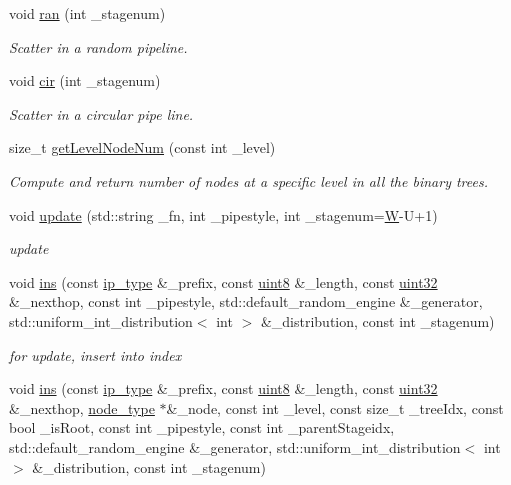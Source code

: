 \begin{DoxyCompactItemize}
void \hyperlink{classRBTree_a8e126bc471ce34a36722f61ff833f002}{ran} (int \-\_\-stagenum)
\begin{DoxyCompactList}\small\item\em Scatter in a random pipeline. \end{DoxyCompactList}\item 
void \hyperlink{classRBTree_aaa068099e5f827f9932e7dca7ac4cd7c}{cir} (int \-\_\-stagenum)
\begin{DoxyCompactList}\small\item\em Scatter in a circular pipe line. \end{DoxyCompactList}\item 
size\-\_\-t \hyperlink{classRBTree_a21eb3efc682903ef05b49472ec3d49c2}{get\-Level\-Node\-Num} (const int \-\_\-level)
\begin{DoxyCompactList}\small\item\em Compute and return number of nodes at a specific level in all the binary trees. \end{DoxyCompactList}\item 
void \hyperlink{classRBTree_ad0ebeb84ec09a401643603abf9342d50}{update} (std\-::string \-\_\-fn, int \-\_\-pipestyle, int \-\_\-stagenum=\hyperlink{test__u128_8cpp_ab21b528bc38899d04d3a7053e52fb797}{W}-\/U+1)
\begin{DoxyCompactList}\small\item\em update \end{DoxyCompactList}\item 
void \hyperlink{classRBTree_a67b0d6c81596d0f3afafc3c1a45800f8}{ins} (const \hyperlink{classRBTree_ab52ca1695103152fd0b1c2b84a33db8b}{ip\-\_\-type} \&\-\_\-prefix, const \hyperlink{types_8h_a34ecedcf03a70dc91e4616212d79267d}{uint8} \&\-\_\-length, const \hyperlink{types_8h_abd01e8e67e3d94cab04ecaaf4f85ac1b}{uint32} \&\-\_\-nexthop, const int \-\_\-pipestyle, std\-::default\-\_\-random\-\_\-engine \&\-\_\-generator, std\-::uniform\-\_\-int\-\_\-distribution$<$ int $>$ \&\-\_\-distribution, const int \-\_\-stagenum)
\begin{DoxyCompactList}\small\item\em for update, insert into index \end{DoxyCompactList}\item 
void \hyperlink{classRBTree_a678b8ede680b0b3d3418eecfe9b665e1}{ins} (const \hyperlink{classRBTree_ab52ca1695103152fd0b1c2b84a33db8b}{ip\-\_\-type} \&\-\_\-prefix, const \hyperlink{types_8h_a34ecedcf03a70dc91e4616212d79267d}{uint8} \&\-\_\-length, const \hyperlink{types_8h_abd01e8e67e3d94cab04ecaaf4f85ac1b}{uint32} \&\-\_\-nexthop, \hyperlink{classRBTree_a34cd65cfffec3d99e0a73deafa471078}{node\-\_\-type} $\ast$\&\-\_\-node, const int \-\_\-level, const size\-\_\-t \-\_\-tree\-Idx, const bool \-\_\-is\-Root, const int \-\_\-pipestyle, const int \-\_\-parent\-Stageidx, std\-::default\-\_\-random\-\_\-engine \&\-\_\-generator, std\-::uniform\-\_\-int\-\_\-distribution$<$ int $>$ \&\-\_\-distribution, const int \-\_\-stagenum)

\end{DoxyCompactItemize}
